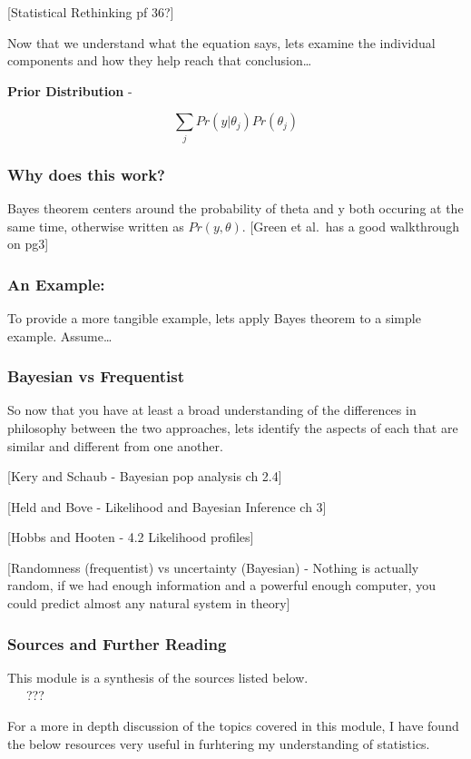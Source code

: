 \documentclass[
]{article}
\begin{document}
{[}Statistical Rethinking pf 36?{]}

Now that we understand what the equation says, lets examine the
individual components and how they help reach that conclusion\ldots{}

\textbf{Prior Distribution} -

\[ \sum_j{Pr(y|\theta_j)} Pr(\theta_j) \]

\hypertarget{why-does-this-work}{%
\subsubsection{Why does this work?}\label{why-does-this-work}}

Bayes theorem centers around the probability of theta and y both
occuring at the same time, otherwise written as \(Pr(y,\theta)\).
{[}Green et al.~has a good walkthrough on pg3{]}

\hypertarget{an-example}{%
\subsubsection{An Example:}\label{an-example}}

To provide a more tangible example, lets apply Bayes theorem to a simple
example. Assume\ldots{}

\hypertarget{bayesian-vs-frequentist}{%
\subsubsection{Bayesian vs Frequentist}\label{bayesian-vs-frequentist}}

So now that you have at least a broad understanding of the differences
in philosophy between the two approaches, lets identify the aspects of
each that are similar and different from one another.

{[}Kery and Schaub - Bayesian pop analysis ch 2.4{]}

{[}Held and Bove - Likelihood and Bayesian Inference ch 3{]}

{[}Hobbs and Hooten - 4.2 Likelihood profiles{]}

{[}Randomness (frequentist) vs uncertainty (Bayesian) - Nothing is
actually random, if we had enough information and a powerful enough
computer, you could predict almost any natural system in theory{]}

\hypertarget{sources-and-further-reading}{%
\subsubsection{Sources and Further
Reading}\label{sources-and-further-reading}}

This module is a synthesis of the sources listed below.\\
   ???

For a more in depth discussion of the topics covered in this module, I
have found the below resources very useful in furhtering my
understanding of statistics.\\
\end{document}
